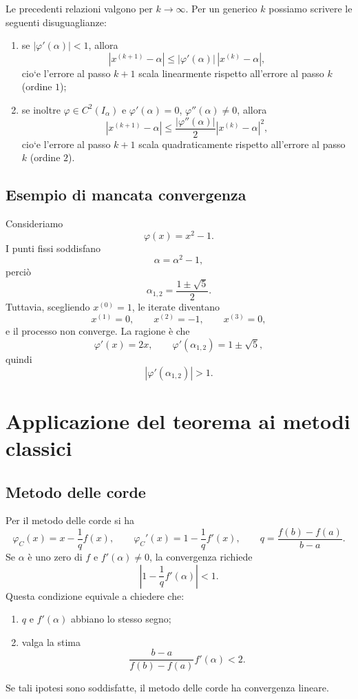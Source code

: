 \documentclass[11pt,a4paper]{report}
\begin{document}
Le precedenti relazioni valgono per $k\to\infty$. Per un generico $k$ possiamo scrivere le seguenti disuguaglianze:
\begin{enumerate}[label=\arabic*)]
  \item se $|\varphi'(\alpha)|<1$, allora
  \[
   |x^{(k+1)}-\alpha|\le |\varphi'(\alpha)|\,|x^{(k)}-\alpha|,
  \]
  cio`e l'errore al passo $k+1$ scala linearmente rispetto all'errore al passo $k$ (ordine $1$);
  \item se inoltre $\varphi\in C^2(I_\alpha)$ e $\varphi'(\alpha)=0$, $\varphi''(\alpha)\neq 0$, allora
  \[
   |x^{(k+1)}-\alpha|\le \frac{|\varphi''(\alpha)|}{2}|x^{(k)}-\alpha|^2,
  \]
  cio`e l'errore al passo $k+1$ scala quadraticamente rispetto all'errore al passo $k$ (ordine $2$).
\end{enumerate}

\subsection{Esempio di mancata convergenza}
Consideriamo
\[
 \varphi(x)=x^2-1.
\]
I punti fissi soddisfano
\[
 \alpha=\alpha^2-1,
\]
perci\`o
\[
 \alpha_{1,2}=\frac{1\pm\sqrt5}{2}.
\]
Tuttavia, scegliendo $x^{(0)}=1$, le iterate diventano
\[
 x^{(1)}=0,
 \qquad x^{(2)}=-1,
 \qquad x^{(3)}=0,
\]
e il processo non converge. La ragione \`e che
\[
 \varphi'(x)=2x,
 \qquad
 \varphi'(\alpha_{1,2})=1\pm\sqrt5,
\]
quindi
\[
 |\varphi'(\alpha_{1,2})|>1.
\]

\section{Applicazione del teorema ai metodi classici}

\subsection{Metodo delle corde}
Per il metodo delle corde si ha
\[
 \varphi_C(x)=x-\frac1q f(x),
 \qquad
 \varphi_C'(x)=1-\frac1q f'(x),
 \qquad
 q=\frac{f(b)-f(a)}{b-a}.
\]
Se $\alpha$ \`e uno zero di $f$ e $f'(\alpha)\neq 0$, la convergenza richiede
\[
 \left|1-\frac1q f'(\alpha)\right|<1.
\]
Questa condizione equivale a chiedere che:
\begin{enumerate}[label=(\roman*)]
  \item $q$ e $f'(\alpha)$ abbiano lo stesso segno;
  \item valga la stima
  \[
  \frac{b-a}{f(b)-f(a)}f'(\alpha)<2.
  \]
\end{enumerate}
Se tali ipotesi sono soddisfatte, il metodo delle corde ha convergenza lineare.
\end{document}
